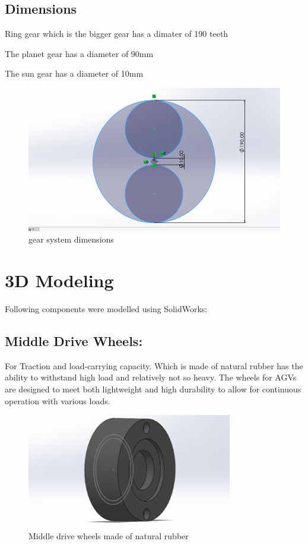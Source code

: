 \documentclass[../../main]{subfiles}
\begin{document}
\subsection{Dimensions}

Ring gear which is the bigger gear has a dimater of 190 teeth

The planet gear has a diameter of 90mm

The sun gear has a diameter of 10mm
\begin{figure}[h]
  \centering
\includegraphics[width=\textwidth]{sublatex/Opryrmi/media/image1.png}
\caption{gear system dimensions}
\end{figure}

\newpage
\section{3D Modeling}

Following components were modelled using SolidWorks:



  \subsection{Middle Drive Wheels:}
  For Traction and load-carrying capacity. Which is
  made of natural rubber has the ability to withstand high load and
  relatively not so heavy. The wheels for AGVs are designed to meet both
  lightweight and high durability to allow for continuous operation with
  various loads.
  \begin{figure}[h]
    \centering
    \includegraphics[width=0.8\textwidth]{sublatex/Opryrmi/media/image2.png} 
    \caption{Middle drive wheels made of natural rubber}
  \end{figure}
\end{document}
